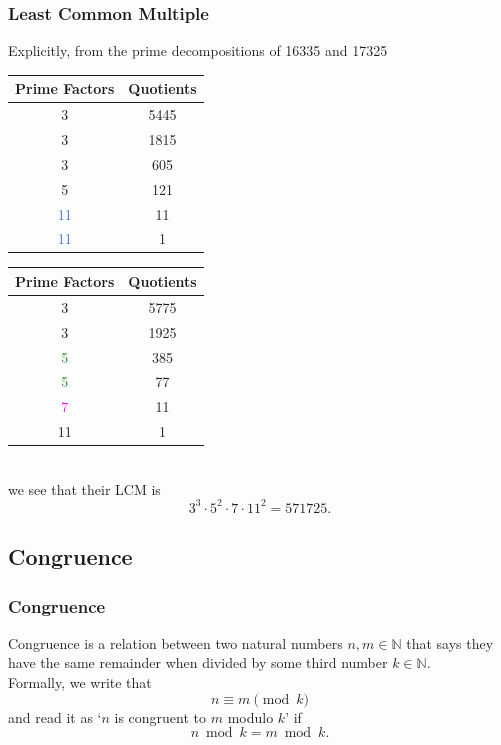 \documentclass[aspectratio=169,11pt,usenames,dvipsnames,handout]{beamer}
\newcommand{\clr}{\textcolor{BrickRed}}
\newcommand{\clb}{\textcolor{RoyalBlue}}
\newcommand{\clg}{\textcolor{ForestGreen}}
\newcommand{\clm}{\textcolor{Magenta}}
\newcommand{\N}{\mathbb{N}}
\begin{document}
\begin{frame}
 \frametitle{Least Common Multiple}
 Explicitly, from the prime decompositions of 16335 and 17325\\
 \vspace{1em}
 \begin{minipage}{.48\textwidth}
  \centering
   \begin{tabular}{c|c}
    \textbf{Prime Factors} & \textbf{Quotients}\\
    \toprule
    \clr{3} & 5445\\
    \clr{3} & 1815\\
    \clr{3} & 605\\
    5 & 121\\
    \clb{11} & 11\\
    \clb{11} & 1
  \end{tabular}
 \end{minipage}
 \begin{minipage}{.48\textwidth}
   \begin{tabular}{c|c}
    \textbf{Prime Factors} & \textbf{Quotients}\\
    \toprule
    3 & 5775\\
    3 & 1925\\
    \clg{5} & 385\\
    \clg{5} & 77\\
    \clm{7} & 11\\
    11 & 1
  \end{tabular}
 \end{minipage}\\
 \pause
 \vspace{1em}
 we see that their LCM is
 \[
  3^3 \cdot 5^2 \cdot 7 \cdot 11^2 = 571725.
 \]
\end{frame}

\subsection{Congruence}

\begin{frame}
 \subsectionpage
\end{frame}

\begin{frame}
 \frametitle{Congruence}
 \begin{tcolorbox}[title=Congruence]
  \alert{Congruence} is a relation between two natural numbers $n,m \in \N$ that
  says they have the same remainder when divided by some third number $k \in
  \N$.\\
  \pause
  Formally, we write that
  \[
   n \equiv m \pmod{k}
  \]
  and read it as `$n$ is congruent to $m$ modulo $k$' if
  \[
   n \bmod k = m \bmod k.
  \]
 \end{tcolorbox}
\end{frame}
\end{document}
